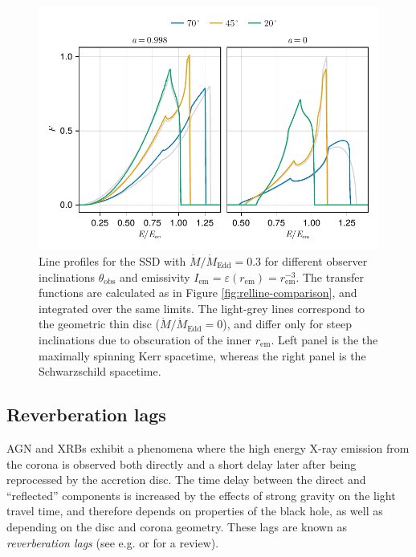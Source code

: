 \documentclass[fleqn,usenatbib]{mnras}
\newcommand{\rhoem}{r_\text{em}}
\begin{document}
\begin{figure}
    \centering
    \includegraphics[width=0.99\linewidth]{figures/lineprofiles.ssd.pdf}
    \caption{Line profiles for the SSD with $\dot{M} / \dot{M}_\text{Edd} = 0.3$ for different observer inclinations $\theta_\text{obs}$ and emissivity $I_\text{em} = \varepsilon(\rhoem) = \rhoem^{-3}$. The transfer functions are calculated as in Figure \ref{fig:relline-comparison}, and integrated over the same limits. The light-grey lines correspond to the geometric thin disc ($\dot{M} / \dot{M}_\text{Edd} = 0$), and differ only for steep inclinations due to obscuration of the inner $\rhoem$. Left panel is the the maximally spinning Kerr spacetime, whereas the right panel is the Schwarzschild spacetime.}
    \label{fig:line-profile-ssd}
\end{figure}


\subsection{Reverberation lags}
\label{sec:lag-transfer-functions}

AGN and XRBs exhibit a phenomena where the high energy X-ray emission from the
corona is observed both directly and a short delay later after being reprocessed
by the accretion disc. The time delay between the direct and ``reflected''
components is increased by the effects of strong gravity on the light travel
time, and therefore depends on properties of the black hole, as well as
depending on the disc and corona geometry. These lags are known as
\textit{reverberation lags} (see e.g. \cite{uttley_x-ray_2014} or
\cite{cackett_reverberation_2021} for a review).
\end{document}
